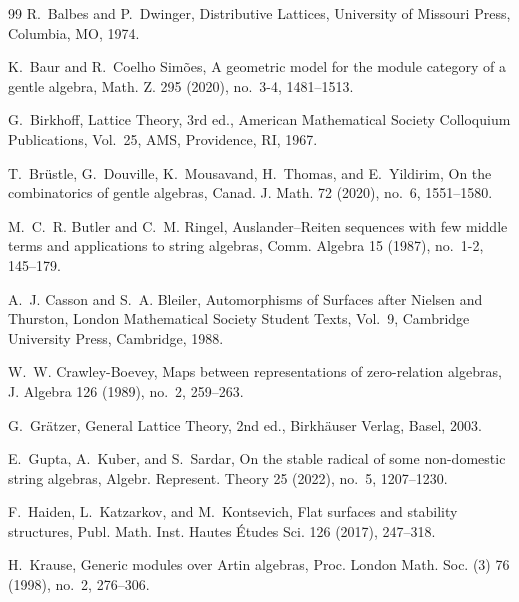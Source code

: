 \documentclass[11pt,a4paper,reqno]{amsart}
\def\emph#1{#1}%
\def\textbf#1{#1}%
\theoremstyle{definition}
\theoremstyle{remark}
\begin{document}
\newpage
\begin{thebibliography}{99}
R.~Balbes and P.~Dwinger,
\emph{Distributive Lattices},
University of Missouri Press, Columbia, MO, 1974.

K.~Baur and R.~Coelho Sim\~oes,
\emph{A geometric model for the module category of a gentle algebra},
Math. Z. \textbf{295} (2020), no.~3-4, 1481--1513.

G.~Birkhoff,
\emph{Lattice Theory}, 3rd ed.,
American Mathematical Society Colloquium Publications, Vol.~25, AMS, Providence, RI, 1967.

T.~Br\"ustle, G.~Douville, K.~Mousavand, H.~Thomas, and E.~Yildirim,
\emph{On the combinatorics of gentle algebras},
Canad. J. Math. \textbf{72} (2020), no.~6, 1551--1580.

M.~C.~R. Butler and C.~M. Ringel,
\emph{Auslander--Reiten sequences with few middle terms and applications to string algebras},
Comm. Algebra \textbf{15} (1987), no.~1-2, 145--179.

A.~J. Casson and S.~A. Bleiler, \emph{Automorphisms of Surfaces after Nielsen and Thurston}, London Mathematical Society Student Texts, Vol.~9, Cambridge University Press, Cambridge, 1988.

W.~W. Crawley-Boevey, \emph{Maps between representations of zero-relation algebras}, J. Algebra \textbf{126} (1989), no.~2, 259--263.

G.~Gr\"atzer, \emph{General Lattice Theory}, 2nd ed.,
Birkh\"auser Verlag, Basel, 2003.

E.~Gupta, A.~Kuber, and S.~Sardar,
\emph{On the stable radical of some non-domestic string algebras}, Algebr. Represent. Theory \textbf{25} (2022), no.~5, 1207--1230.

F.~Haiden, L.~Katzarkov, and M.~Kontsevich,
\emph{Flat surfaces and stability structures},
Publ. Math. Inst. Hautes \'Etudes Sci. \textbf{126} (2017), 247--318.

H.~Krause, \emph{Generic modules over Artin algebras},
Proc. London Math. Soc. (3) \textbf{76} (1998), no.~2, 276--306.


\end{thebibliography}
\end{document}
